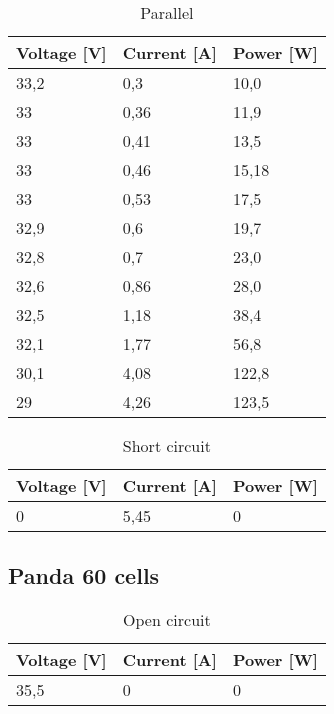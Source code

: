 \documentclass[12pt]{article}
\begin{document}
\begin{table}[h]
	\centering
	\begin{tabular}{|p{2cm}|p{2cm}|p{2cm}|}
		\hline
		\rowcolor{RedOrange!80} Voltage [V] & Current [A] & Power [W] \\
		\hline
		\rowcolor{Peach!70} 33,2            & 0,3         & 10,0      \\
		\hline
		\rowcolor{Melon!70} 33              & 0,36        & 11,9      \\
		\hline
		\rowcolor{Peach!70} 33              & 0,41        & 13,5      \\
		\hline
		\rowcolor{Melon!70} 33              & 0,46        & 15,18     \\
		\hline
		\rowcolor{Peach!70} 33              & 0,53        & 17,5      \\
		\hline
		\rowcolor{Melon!70} 32,9            & 0,6         & 19,7      \\
		\hline
		\rowcolor{Peach!70} 32,8            & 0,7         & 23,0      \\
		\hline
		\rowcolor{Melon!70} 32,6            & 0,86        & 28,0      \\
		\hline
		\rowcolor{Peach!70} 32,5            & 1,18        & 38,4      \\
		\hline
		\rowcolor{Melon!70} 32,1            & 1,77        & 56,8      \\
		\hline
		\rowcolor{Peach!70} 30,1            & 4,08        & 122,8     \\
		\hline
		\rowcolor{Melon!70} 29              & 4,26        & 123,5     \\
		\hline
	\end{tabular}
	\caption{Parallel}
	\label{tab:my_label}
\end{table}

\begin{table}[!h]
	\centering
	\begin{tabular}{|p{2cm}|p{2cm}|p{2cm}|}
		\hline
		\rowcolor{Red!80} Voltage [V] & Current [A] & Power [W] \\
		\hline
		\rowcolor{Red!60} 0           & 5,45        & 0         \\
		\hline
	\end{tabular}
	\caption{Short circuit}
	\label{tab:my_label}
\end{table}

\FloatBarrier
\subsection{Panda 60 cells}
\begin{table}[!h]
	\centering
	\begin{tabular}{|p{2cm}|p{2cm}|p{2cm}|}
		\hline
		\rowcolor{RoyalBlue!80} Voltage [V] & Current [A] & Power [W] \\
		\hline
		\rowcolor{Cerulean!70}    35,5      & 0           & 0         \\
		\hline
	\end{tabular}
	\caption{Open circuit}
	\label{tab:my_label}
\end{table}
\end{document}
